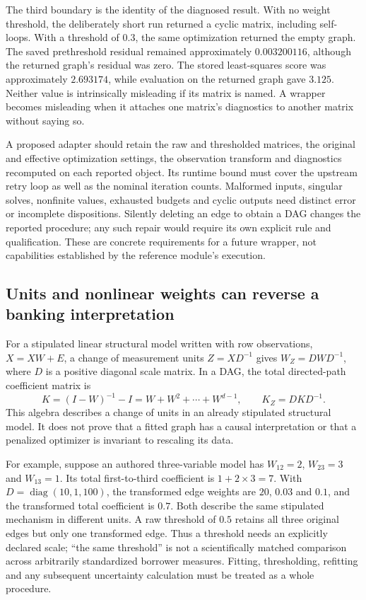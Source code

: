 The third boundary is the identity of the diagnosed result. With no weight
threshold, the deliberately short run returned a cyclic matrix, including
self-loops. With a threshold of $0.3$, the same optimization returned the
empty graph. The saved prethreshold residual remained approximately
$0.003200116$, although the returned graph's residual was zero. The stored
least-squares score was approximately $2.693174$, while evaluation on the
returned graph gave $3.125$. Neither value is intrinsically misleading if
its matrix is named. A wrapper becomes misleading when it attaches one
matrix's diagnostics to another matrix without saying so.
\citep{exec16_dagma_runtime}

A proposed adapter should retain the raw and thresholded matrices, the
original and effective optimization settings, the observation transform and
diagnostics recomputed on each reported object. Its runtime bound must cover
the upstream retry loop as well as the nominal iteration counts. Malformed
inputs, singular solves, nonfinite values, exhausted budgets and cyclic
outputs need distinct error or incomplete dispositions. Silently deleting
an edge to obtain a DAG changes the reported procedure; any such repair
would require its own explicit rule and qualification. These are concrete
requirements for a future wrapper, not capabilities established by the
reference module's execution.
\citep{exec16_dagma_primary,exec16_dagma_runtime}

\subsection{Units and nonlinear weights can reverse a banking interpretation}

For a stipulated linear structural model written with row observations,
$X=XW+E$, a change of measurement units $Z=XD^{-1}$ gives
$W_Z=DW D^{-1}$, where $D$ is a positive diagonal scale matrix. In a DAG,
the total directed-path coefficient matrix is
\begin{equation}
 K=(I-W)^{-1}-I=W+W^2+\cdots+W^{d-1},\qquad
 K_Z=DKD^{-1}.
\end{equation}
This algebra describes a change of units in an already stipulated structural
model. It does not prove that a fitted graph has a causal interpretation or
that a penalized optimizer is invariant to rescaling its data.
\citep{exec16_dagma_exact}

For example, suppose an authored three-variable model has
$W_{12}=2$, $W_{23}=3$ and $W_{13}=1$. Its total first-to-third coefficient
is $1+2\times3=7$. With $D=\operatorname{diag}(10,1,100)$, the transformed
edge weights are $20$, $0.03$ and $0.1$, and the transformed total coefficient
is $0.7$. Both describe the same stipulated mechanism in different units.
A raw threshold of $0.5$ retains all three original edges but only one
transformed edge. Thus a threshold needs an explicitly declared scale;
``the same threshold'' is not a scientifically matched comparison across
arbitrarily standardized borrower measures. Fitting, thresholding, refitting
and any subsequent uncertainty calculation must be treated as a whole
procedure.
\citep{exec16_dagma_exact}

